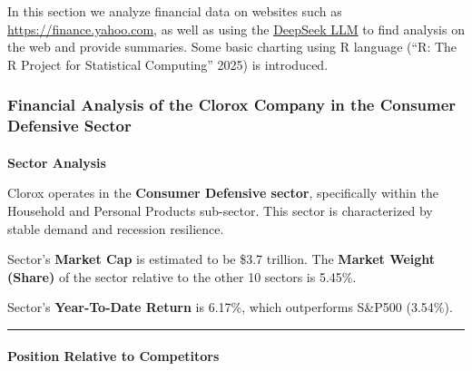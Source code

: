 \documentclass[
  letterpaper,
  DIV=11,
  numbers=noendperiod]{scrartcl}
\makeatletter
\let\oldparagraph\paragraph
\renewcommand{\paragraph}{
    \@ifstar
      \xxxParagraphStar
      \xxxParagraphNoStar
  }
\newcommand{\xxxParagraphStar}[1]{\oldparagraph*{#1}\mbox{}}
\newcommand{\xxxParagraphNoStar}[1]{\oldparagraph{#1}\mbox{}}
\makeatother
\begin{document}
\begin{tcolorbox}[enhanced jigsaw, arc=.35mm, toprule=.15mm, bottomtitle=1mm, leftrule=.75mm, breakable, coltitle=black, colback=white, opacitybacktitle=0.6, colframe=quarto-callout-note-color-frame, rightrule=.15mm, left=2mm, toptitle=1mm, title=\textcolor{quarto-callout-note-color}{\faInfo}\hspace{0.5em}{Note}, titlerule=0mm, bottomrule=.15mm, opacityback=0, colbacktitle=quarto-callout-note-color!10!white]

In this section we analyze financial data on websites such as
\url{https://finance.yahoo.com}, as well as using the
\href{https://chat.deepseek.com/}{DeepSeek LLM} to find analysis on the
web and provide summaries. Some basic charting using R language ({``R:
{The R Project} for {Statistical Computing}''} 2025) is introduced.

\end{tcolorbox}

\subsubsection{\texorpdfstring{\textbf{Financial Analysis of the Clorox
Company in the Consumer Defensive
Sector}}{Financial Analysis of the Clorox Company in the Consumer Defensive Sector}}\label{financial-analysis-of-the-clorox-company-in-the-consumer-defensive-sector}

\paragraph{\texorpdfstring{\textbf{Sector
Analysis}}{Sector Analysis}}\label{sector-analysis-1}

Clorox operates in the \textbf{Consumer Defensive sector}, specifically
within the Household and Personal Products sub-sector. This sector is
characterized by stable demand and recession resilience.

Sector's \textbf{Market Cap} is estimated to be \$3.7 trillion. The
\textbf{Market Weight (Share)} of the sector relative to the other 10
sectors is 5.45\%.

Sector's \textbf{Year-To-Date Return} is 6.17\%, which outperforms
S\&P500 (3.54\%).

\begin{center}\rule{0.5\linewidth}{0.5pt}\end{center}

\paragraph{\texorpdfstring{\textbf{Position Relative to
Competitors}}{Position Relative to Competitors}}\label{position-relative-to-competitors}
\end{document}
